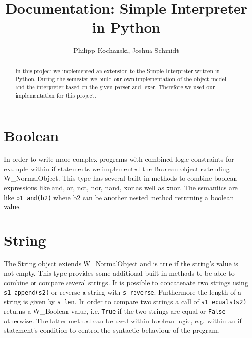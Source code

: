 \documentclass{article}
\begin{document}
\title{Documentation: Simple Interpreter in Python}
\author{Philipp Kochanski, Joshua Schmidt}

\maketitle

\begin{abstract}
In this project we implemented an extension to the Simple Interpreter written in Python. During the semester we build our own implementation of the object model and the interpreter based on the given parser and lexer. Therefore we used our implementation for this project.
\end{abstract}

\section{Boolean}
In order to write more complex programs with combined logic constraints for example within if statements we implemented the Boolean object extending W\_NormalObject.
This type has several built-in methods to combine boolean expressions like and, or, not, nor, nand, xor as well as xnor.
The semantics are like \texttt{b1 and(b2)} where b2 can be another nested method returning a boolean value.


\section{String}
The String object extends W\_NormalObject and is true if the string's value is not empty.
This type provides some additional built-in methods to be able to combine or compare several strings. 
It is possible to concatenate two strings using \texttt{s1 append(s2)} or reverse a string with \texttt{s reverse}. Furthermore the length of a string is given by \texttt{s len}. 
In order to compare two strings a call of \texttt{s1 equals(s2)} returns a W\_Boolean value, i.e. \texttt{True} if the two strings are equal or \texttt{False} otherwise.
The latter method can be used within boolean logic, e.g. within an if statement's condition to control the syntactic behaviour of the program.
\end{document}
